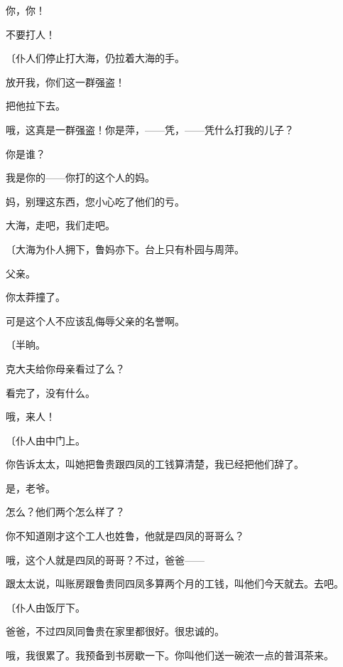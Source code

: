 你，你！

不要打人！

{\fangsong〔仆人们停止打大海，仍拉着大海的手。}

放开我，你们这一群强盗！

把他拉下去。

哦，这真是一群强盗！你是萍，——凭，——凭什么打我的儿子？

你是谁？

我是你的——你打的这个人的妈。

妈，别理这东西，您小心吃了他们的亏。

大海，走吧，我们走吧。

{\fangsong〔大海为仆人拥下，鲁妈亦下。台上只有朴园与周萍。}

父亲。

你太莽撞了。

可是这个人不应该乱侮辱父亲的名誉啊。

{\fangsong〔半晌。}

克大夫给你母亲看过了么？

看完了，没有什么。

哦，来人！

{\fangsong〔仆人由中门上。}

你告诉太太，叫她把鲁贵跟四凤的工钱算清楚，我已经把他们辞了。

是，老爷。

怎么？他们两个怎么样了？

你不知道刚才这个工人也姓鲁，他就是四凤的哥哥么？

哦，这个人就是四凤的哥哥？不过，爸爸——

跟太太说，叫账房跟鲁贵同四凤多算两个月的工钱，叫他们今天就去。去吧。

{\fangsong〔仆人由饭厅下。}

爸爸，不过四凤同鲁贵在家里都很好。很忠诚的。

哦，我很累了。我预备到书房歇一下。你叫他们送一碗浓一点的普洱茶来。

